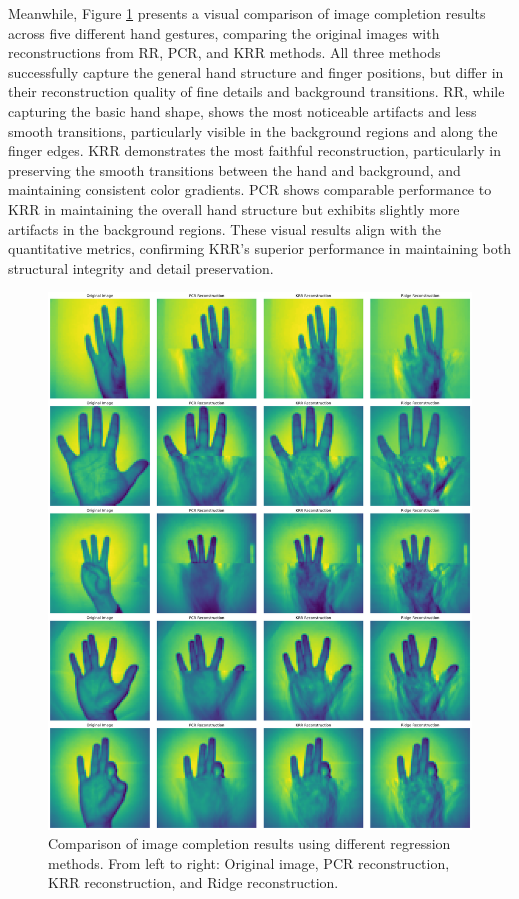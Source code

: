 \documentclass{article}
\begin{document}
        Meanwhile, Figure \ref{fig:completion_comparison} presents a visual comparison of image completion results across five different hand gestures, comparing the original images with reconstructions from RR, PCR, and KRR methods. All three methods successfully capture the general hand structure and finger positions, but differ in their reconstruction quality of fine details and background transitions. RR, while capturing the basic hand shape, shows the most noticeable artifacts and less smooth transitions, particularly visible in the background regions and along the finger edges. KRR demonstrates the most faithful reconstruction, particularly in preserving the smooth transitions between the hand and background, and maintaining consistent color gradients. PCR shows comparable performance to KRR in maintaining the overall hand structure but exhibits slightly more artifacts in the background regions. These visual results align with the quantitative metrics, confirming KRR's superior performance in maintaining both structural integrity and detail preservation. 
        \begin{figure}[H]
            \centering
            \includegraphics[width=\textwidth]{image_completion_comparison.png}
            \caption{Comparison of image completion results using different regression methods. From left to right: Original image, PCR reconstruction, KRR reconstruction, and Ridge reconstruction.}
            \label{fig:completion_comparison}
        \end{figure}
\end{document}
